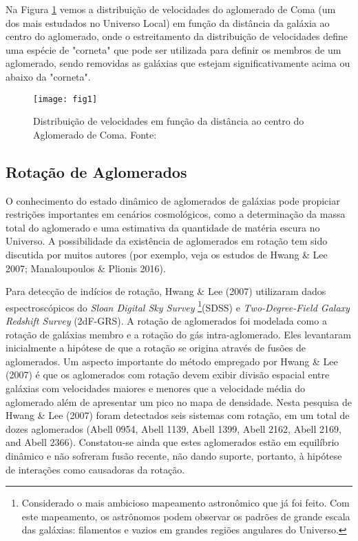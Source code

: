 \documentclass[12pt,fleqn]{article}
\begin{document}
{Na Figura \ref{fig2} vemos a distribuição de velocidades do aglomerado de
 Coma (um dos mais estudados no Universo Local) em função da distância da
galáxia ao centro do aglomerado, onde o estreitamento da distribuição de velocidades
define uma espécie de "corneta" que pode ser utilizada para definir os membros
de um aglomerado, sendo removidas as galáxias que estejam
significativamente acima ou abaixo da "corneta".


\begin{figure}[!htbp] %
\vspace{-2pt}
\begin{center}
\texttt{[image: fig1]}%
\caption{Distribuição de velocidades em função da distância ao centro do Aglomerado de Coma. Fonte:}
\label{fig2}%
\end{center}
\end{figure}

\subsection{Rotação de Aglomerados}
O conhecimento do estado dinâmico de aglomerados de galáxias pode propiciar restrições importantes em cenários cosmológicos, como a determinação da massa total do aglomerado e uma estimativa da quantidade de matéria escura no Universo. A possibilidade da existência de aglomerados em rotação tem sido discutida por muitos autores (por exemplo, veja os estudos de Hwang \& Lee 2007; Manaloupoulos \& Plionis 2016). 

Para detecção de indícios de rotação, Hwang \& Lee (2007) utilizaram dados espectroscópicos do \textit{Sloan Digital Sky Survey} \footnote{Considerado o mais ambicioso mapeamento astronômico que já foi feito. Com este mapeamento, os astrônomos podem observar os padrões de grande escala das galáxias: filamentos e vazios em grandes regiões angulares do Universo.}(SDSS) e \textit{Two-Degree-Field Galaxy Redshift Survey} (2dF-GRS). A rotação de aglomerados foi modelada como a rotação de galáxias membro e a rotação do gás intra-aglomerado. Eles levantaram inicialmente a hipótese de que a rotação se origina através de fusões de aglomerados. Um aspecto importante do método empregado por Hwang \& Lee (2007) é que os aglomerados com rotação devem exibir divisão espacial entre galáxias com velocidades maiores e menores que a velocidade média do aglomerado além de apresentar um pico no mapa de densidade. Nesta pesquisa de Hwang \& Lee (2007) foram detectados seis sistemas com rotação, em um total de dozes aglomerados (Abell 0954, Abell 1139, Abell 1399, Abell 2162, Abell 2169, and Abell 2366). Constatou-se ainda que estes aglomerados estão em equilíbrio dinâmico e não sofreram fusão recente, não dando suporte, portanto, à hipótese de interações como causadoras da rotação. 

}
\end{document}
